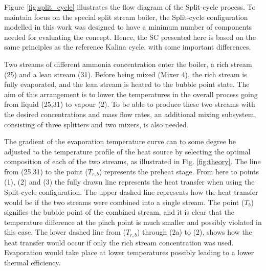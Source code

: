\documentclass[review,3p]{elsarticle}
\begin{document}
Figure \ref{fig:split_cycle} illustrates the flow diagram of the Split-cycle process. To maintain focus on the special split stream boiler, the Split-cycle configuration modelled in this work was designed to have a minimum number of components needed for evaluating the concept. Hence, the SC presented here is based on the same principles as the reference Kalina cycle, with some important differences. 

Two streams of different ammonia concentration enter the boiler, a rich stream (25) and a lean stream (31). Before being mixed (Mixer 4), the rich stream is fully evaporated, and the lean stream is heated to the bubble point state. The aim of this arrangement is to lower the temperatures in the overall process going from liquid (25,31) to vapour (2). To be able to produce these two streams with the desired concentrations and mass flow rates, an additional mixing subsystem, consisting of three splitters and two mixers, is also needed. 

The gradient of the evaporation temperature curve can to some degree be adjusted to the temperature profile of the heat source by selecting the optimal composition of each of the two streams, as illustrated in Fig. \ref{fig:theory}. The line from (25,31) to the point ($T_{r,b}$) represents the preheat stage. From here to points (1), (2) and (3) the fully drawn line represents the heat transfer when using the Split-cycle configuration. The upper dashed line represents how the heat transfer would be if the two streams were combined into a single stream. The point ($T_{b}$) signifies the bubble point of the combined stream, and it is clear that the temperature difference at the pinch point is much smaller and possibly violated in this case. The lower dashed line from ($T_{r,b}$) through (2a) to (2), shows how the heat transfer would occur if only the rich stream concentration was used. Evaporation would take place at lower temperatures possibly leading to a lower thermal efficiency. 
\end{document}

